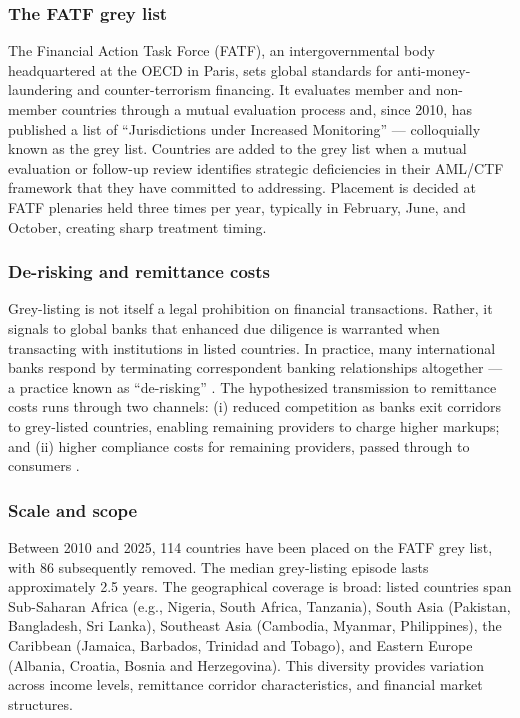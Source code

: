 \documentclass[12pt]{article}
\begin{document}
\subsubsection*{The FATF grey list} The Financial Action Task Force (FATF), an intergovernmental body headquartered at the OECD in Paris, sets global standards for anti-money-laundering and counter-terrorism financing. It evaluates member and non-member countries through a mutual evaluation process and, since 2010, has published a list of ``Jurisdictions under Increased Monitoring'' --- colloquially known as the grey list. Countries are added to the grey list when a mutual evaluation or follow-up review identifies strategic deficiencies in their AML/CTF framework that they have committed to addressing. Placement is decided at FATF plenaries held three times per year, typically in February, June, and October, creating sharp treatment timing.

\subsubsection*{De-risking and remittance costs} Grey-listing is not itself a legal prohibition on financial transactions. Rather, it signals to global banks that enhanced due diligence is warranted when transacting with institutions in listed countries. In practice, many international banks respond by terminating correspondent banking relationships altogether --- a practice known as ``de-risking'' \citep{fsb2018}. The hypothesized transmission to remittance costs runs through two channels: (i) reduced competition as banks exit corridors to grey-listed countries, enabling remaining providers to charge higher markups; and (ii) higher compliance costs for remaining providers, passed through to consumers \citep{cgd2016}.

\subsubsection*{Scale and scope} Between 2010 and 2025, 114 countries have been placed on the FATF grey list, with 86 subsequently removed. The median grey-listing episode lasts approximately 2.5 years. The geographical coverage is broad: listed countries span Sub-Saharan Africa (e.g., Nigeria, South Africa, Tanzania), South Asia (Pakistan, Bangladesh, Sri Lanka), Southeast Asia (Cambodia, Myanmar, Philippines), the Caribbean (Jamaica, Barbados, Trinidad and Tobago), and Eastern Europe (Albania, Croatia, Bosnia and Herzegovina). This diversity provides variation across income levels, remittance corridor characteristics, and financial market structures.
\end{document}
